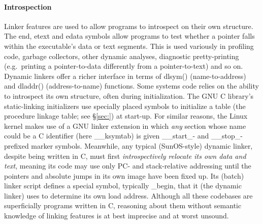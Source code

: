 \paragraph{Introspection}
Linker features are used to allow programs to introspect on their own structure.
The \textsf{end}, \textsf{etext} and \textsf{edata} symbols 
allow programs to test whether a pointer falls within the 
executable's data or text segments. 
This is used variously in profiling code, garbage collectors,
other dynamic analyses, diagnostic pretty-printing 
(e.g.\ printing a pointer-to-data differently from a pointer-to-text)
and so on.
Dynamic linkers offer a richer interface 
in terms of \textsf{dlsym()} (name-to-address) and \textsf{dladdr()} (address-to-name) functions.
Some systems code 
relies on the ability to introspect its own structure,
often during initialization.
The GNU C library's static-linking initializers 
use specially placed symbols to initialize a table (the procedure linkage table; see \S\ref{sec:})
at start-up.
For similar reasons, the Linux kernel 
makes use of a GNU linker extension in which \emph{any}
section whose name could be a C identifier (here \textsf{\_\_ksymtab})
is given \textsf{\_\_start\_}- and \textsf{\_\_stop\_}-prefixed
marker symbols.
Meanwhile, any typical (SunOS-style) dynamic linker, despite being written in C,
must first \emph{introspectively relocate its own data and text}, 
meaning its code may use only PC- and stack-relative addressing
until the pointers and absolute jumps in its own image
have been fixed up.
Its (batch) linker script defines a special symbol, typically \textsf{\_begin}, 
that it (the dynamic linker) uses to determine its own load address.
Although all these codebases are superficially 
programs written in C, reasoning about them
without semantic knowledge of linking features 
is at best imprecise and at worst unsound.


%
%


